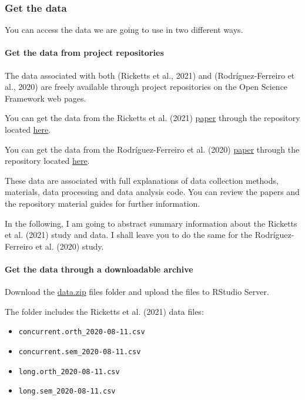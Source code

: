 \documentclass[
  letterpaper,
  DIV=11,
  numbers=noendperiod]{scrreprt}
\let\oldparagraph\paragraph
\renewcommand{\paragraph}[1]{\oldparagraph{#1}\mbox{}}
\begin{document}
\hypertarget{sec-get-data}{%
\subsubsection{Get the data}\label{sec-get-data}}

You can access the data we are going to use in two different ways.

\hypertarget{sec-from-repros}{%
\paragraph{Get the data from project
repositories}\label{sec-from-repros}}

The data associated with both (Ricketts et al., 2021) and
(Rodríguez-Ferreiro et al., 2020) are freely available through project
repositories on the Open Science Framework web pages.

You can get the data from the Ricketts et al. (2021)
\href{https://www.sciencedirect.com/science/article/pii/S095947522100027X}{paper}
through the repository located
\href{https://osf.io/e5gzk/?view_only=038118528c7c426c9729983f54138c88}{here}.

You can get the data from the Rodríguez-Ferreiro et al. (2020)
\href{https://peerj.com/articles/9511/}{paper} through the repository
located \href{https://osf.io/j29fn/}{here}.

These data are associated with full explanations of data collection
methods, materials, data processing and data analysis code. You can
review the papers and the repository material guides for further
information.

In the following, I am going to abstract summary information about the
Ricketts et al. (2021) study and data. I shall leave you to do the same
for the Rodríguez-Ferreiro et al. (2020) study.

\hypertarget{sec-download}{%
\paragraph{Get the data through a downloadable
archive}\label{sec-download}}

Download the \href{files/data.zip}{data.zip} files folder and upload the
files to RStudio Server.

The folder includes the Ricketts et al. (2021) data files:

\begin{itemize}
\item
  \texttt{concurrent.orth\_2020-08-11.csv}
\item
  \texttt{concurrent.sem\_2020-08-11.csv}
\item
  \texttt{long.orth\_2020-08-11.csv}
\item
  \texttt{long.sem\_2020-08-11.csv}
\end{itemize}
\end{document}
